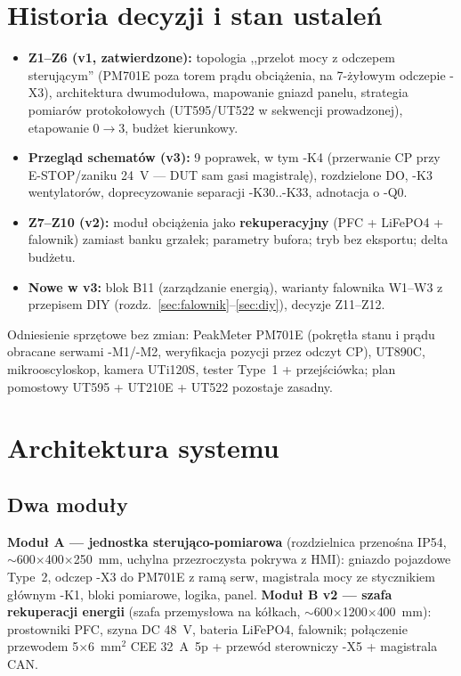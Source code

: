 \documentclass[11pt,a4paper]{article}
\begin{document}
\section{Historia decyzji i stan ustaleń}
\label{sec:historia}
\begin{itemize}
\item \textbf{Z1--Z6 (v1, zatwierdzone):} topologia ,,przelot mocy z odczepem sterującym''
(PM701E poza torem prądu obciążenia, na 7-żyłowym odczepie -X3), architektura dwumodułowa,
mapowanie gniazd panelu, strategia pomiarów protokołowych (UT595/UT522 w sekwencji prowadzonej),
etapowanie 0$\to$3, budżet kierunkowy.
\item \textbf{Przegląd schematów (v3):} 9 poprawek, w tym -K4 (przerwanie CP przy E-STOP/zaniku
24~V --- DUT sam gasi magistralę), rozdzielone DO, -K3 wentylatorów, doprecyzowanie separacji
-K30..-K33, adnotacja o -Q0.
\item \textbf{Z7--Z10 (v2):} moduł obciążenia jako \textbf{rekuperacyjny} (PFC + LiFePO4 +
falownik) zamiast banku grzałek; parametry bufora; tryb bez eksportu; delta budżetu.
\item \textbf{Nowe w v3:} blok B11 (zarządzanie energią), warianty falownika W1--W3 z przepisem
DIY (rozdz.~\ref{sec:falownik}--\ref{sec:diy}), decyzje Z11--Z12.
\end{itemize}
Odniesienie sprzętowe bez zmian: PeakMeter PM701E (pokrętła stanu i prądu obracane serwami
-M1/-M2, weryfikacja pozycji przez odczyt CP), UT890C, mikrooscyloskop, kamera UTi120S,
tester Type~1 + przejściówka; plan pomostowy UT595 + UT210E + UT522 pozostaje zasadny.

\section{Architektura systemu}
\subsection{Dwa moduły}
\textbf{Moduł A --- jednostka sterująco-pomiarowa} (rozdzielnica przenośna IP54, $\sim$600$\times$400$\times$250~mm,
uchylna przezroczysta pokrywa z HMI): gniazdo pojazdowe Type~2, odczep -X3 do PM701E z ramą serw,
magistrala mocy ze stycznikiem głównym -K1, bloki pomiarowe, logika, panel. \textbf{Moduł B v2 ---
szafa rekuperacji energii} (szafa przemysłowa na kółkach, $\sim$600$\times$1200$\times$400~mm):
prostowniki PFC, szyna DC 48~V, bateria LiFePO4, falownik; połączenie przewodem 5$\times$6~mm$^2$
CEE 32~A~5p + przewód sterowniczy -X5 + magistrala CAN.
\end{document}
